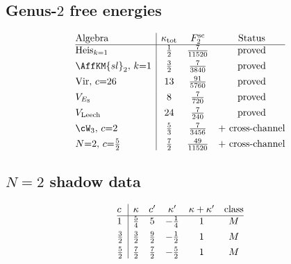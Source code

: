 \subsection{Genus-$2$ free energies}
\label{subsec:comp-genus2-table}

\begin{table}[htbp]
\centering
\caption{Genus-$2$ free energies.
$F_2^{\mathrm{sc}} = \kappa_{\mathrm{tot}} \cdot 7/5760$.}
\label{tab:comp-genus2}
\small
\[
\begin{array}{@{}l|ccc@{}}
 \text{Algebra} & \kappa_{\mathrm{tot}}
 & F_2^{\mathrm{sc}} & \text{Status} \\
\hline
 \text{Heis}_{k=1} & \frac{1}{2}
 & \frac{7}{11520} & \text{proved} \\[4pt]
 \AffKM{sl}_2,\, k{=}1 & \frac{3}{2}
 & \frac{7}{3840} & \text{proved} \\[4pt]
 \text{Vir},\, c{=}26 & 13
 & \frac{91}{5760} & \text{proved} \\[4pt]
 V_{E_8} & 8
 & \frac{7}{720} & \text{proved} \\[4pt]
 V_{\mathrm{Leech}} & 24
 & \frac{7}{240} & \text{proved} \\[4pt]
 \cW_3,\, c{=}2 & \frac{5}{3}
 & \frac{7}{3456} & \text{+ cross-channel} \\[4pt]
 N{=}2,\, c{=}\tfrac{5}{2} & \frac{7}{2}
 & \frac{49}{11520} & \text{+ cross-channel}
\end{array}
\]
\end{table}


\subsection{$N{=}2$ shadow data}
\label{subsec:comp-n2-table}

\begin{table}[htbp]
\centering
\caption{$N{=}2$ SCA shadow data. Additive duality $c' = 6 - c$,
complementarity $\kappa + \kappa' = 1$.}
\label{tab:comp-n2-data}
\small
\[
\begin{array}{@{}l|ccccc@{}}
 c & \kappa & c' & \kappa' & \kappa + \kappa'
 & \text{class} \\
\hline
 1 & \frac{5}{4} & 5 & -\frac{1}{4} &
 1 & M \\[4pt]
 \frac{3}{2} & \frac{3}{2} & \frac{9}{2} & -\frac{1}{2} &
 1 & M \\[4pt]
 \frac{5}{2} & \frac{7}{2} & \frac{7}{2} & -\frac{5}{2} &
 1 & M
\end{array}
\]
\end{table}


